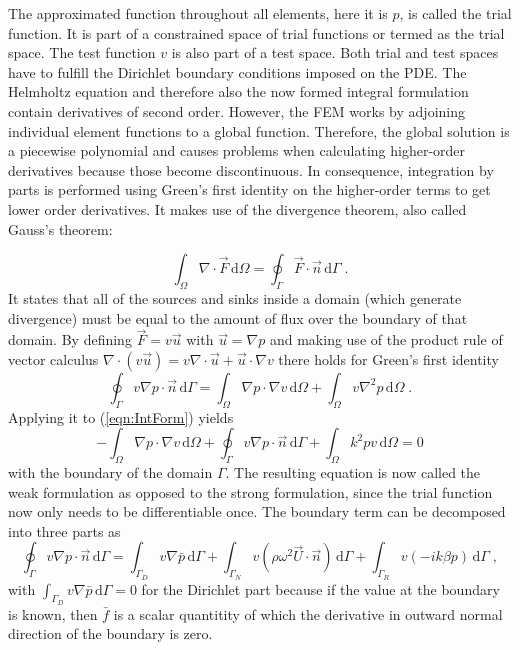 \documentclass[%
  a4paper,oneside,%
  11pt,%
  smallchapters,
  style=printdev,
  extramargin,
  green,%
  rgb, <cmyk>
  ]{tubsbook}
\begin{document}
The approximated function throughout all elements, here it is $p$, is called the trial function. It is part of a constrained space of trial functions or termed as the trial space. The test function $v$ is also part of a test space. Both trial and test spaces have to fulfill the Dirichlet boundary conditions imposed on the PDE.
The Helmholtz equation and therefore also the now formed integral formulation contain derivatives of second order. However, the FEM works by adjoining individual element functions to a global function. Therefore, the global solution is a piecewise polynomial \cite{langtangen2019} and causes problems when calculating higher-order derivatives because those become discontinuous. In consequence, integration by parts is performed using Green's first identity \cite[pp. 53,54]{atalla2015} on the higher-order terms to get lower order derivatives. It makes use of the divergence theorem, also called Gauss's theorem:

\begin{equation}
\int_{\Omega}  \nabla \cdot \vec{F} \,\mathrm{d}\Omega = \oint_{\Gamma} \vec{F} \cdot \vec{n} \,\mathrm{d}\Gamma \; .
\label{eqn:DivTheo}
\end{equation}
It states that all of the sources and sinks inside a domain (which generate divergence) must be equal to the amount of flux over the boundary of that domain. 
By defining  $\vec{F} = v \vec{u}$ with $\vec{u} = \nabla p$ and making use of the product rule of vector calculus $\nabla \cdot (v \vec{u}) = v \nabla \cdot \vec{u} + \vec{u} \cdot \nabla v$ there holds for Green's first identity
\begin{equation}
\oint_{\Gamma} v \nabla p \cdot \vec{n} \,\mathrm{d}\Gamma = \int_{\Omega} \nabla p \cdot \nabla v \,\mathrm{d}\Omega + \int_{\Omega}  v\nabla^2 p \,\mathrm{d}\Omega \; .
\end{equation}
%
Applying it to (\ref{eqn:IntForm}) yields
\begin{equation}
-\int_{\Omega} \nabla p \cdot \nabla v \,\mathrm{d}\Omega + \oint_{\Gamma} v \nabla p \cdot \vec{n} \,\mathrm{d}\Gamma+ \int_{\Omega} k^2 pv \,\mathrm{d}\Omega = 0
\label{eqn:WeakHelmholtz}
\end{equation}
with the boundary of the domain $\Gamma$.
The resulting equation is now called the weak formulation as opposed to the strong formulation, since the trial function now only needs to be differentiable once.
The boundary term can be decomposed into three parts as
\begin{equation}
\oint_{\Gamma} v \nabla p \cdot \vec{n} \,\mathrm{d}\Gamma = \int_{\Gamma_D} v \nabla \bar{p}  \,\mathrm{d}\Gamma + \int_{\Gamma_N} v (\rho \omega^2 \vec{U} \cdot \vec{n})  \,\mathrm{d}\Gamma + \int_{\Gamma_R} v(-ik\beta p)  \,\mathrm{d}\Gamma \;,
\end{equation}
with $\int_{\Gamma_D} v \nabla \bar{p}  \,\mathrm{d}\Gamma = 0$ for the Dirichlet part because if the value at the boundary is known, then $\bar{f}$ is a scalar quantitity of which the derivative in outward normal direction of the boundary is zero.
\end{document}
